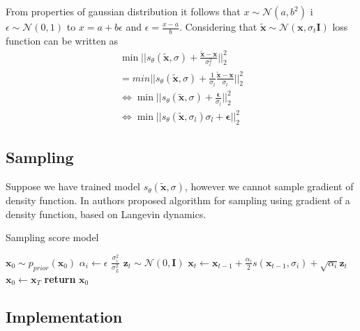\documentclass[10pt]{article}
\begin{document}
From properties of gaussian distribution it follows that $x \sim \mathcal{N}(a, b^2)$ i  $\epsilon \sim \mathcal{N}(0, 1)$ to $x = a + b\epsilon$ and $ \epsilon = \frac{x- a}{b}$. Considering that $\tilde{\textbf{x}} \sim \mathcal{N}(\textbf{x}, \sigma_t \mathbf{I})$ loss function can be written as
\begin{gather}
    \min ||  s_{\theta}(\tilde{\textbf{x}}, \sigma)  + \frac{\tilde{\textbf{x}} - \textbf{x}}{ \sigma_l^2} ||_2^2 \\
    = min ||  s_{\theta}(\tilde{\textbf{x}}, \sigma)  + \frac{1}{\sigma_l} \frac{\tilde{\textbf{x}} - \textbf{x}}{ \sigma_l} ||_2^2 \\
    \iff \min \Big|\Big|  s_{\theta}(\tilde{\textbf{x}}, \sigma)  + \frac{ \bm{\epsilon} }{ \sigma_l} \Big|\Big|_2^2 \\
    \iff \min ||  s_{\theta}(\tilde{\textbf{x}}, \sigma_l) \sigma_l + \bm{\epsilon} ||_2^2
\end{gather}

\subsection{Sampling}
Suppose we have trained model  $ s_{\theta}(\tilde{\textbf{x}}, \sigma)$, however we cannot sample gradient of density function. In \cite{score_model} authors proposed algorithm for sampling using gradient of a density function, based on Langevin dynamics. 

\begin{algorithm} [H]
\caption{Sampling score model}\label{alg:cap}
\begin{algorithmic}

\State $\textbf{x}_0 \sim p_{prior}(\textbf{x}_0)$
    \State $\alpha_i \gets  \epsilon$ $\frac{ \sigma_i^2 }{\sigma_L^2 }$
        \State $\textbf{z}_t \sim \mathcal{N}(0, \mathbf{I})$
       \State $\textbf{x}_t \gets \textbf{x}_{t -1} + \frac{\alpha_i}{2} s(\textbf{x}_{t -1}, \sigma_i ) + \sqrt{\alpha_i}\textbf{z}_t$
    \EndFor
    \State $\textbf{x}_0 \gets \textbf{x}_T$
\EndFor
\State \textbf{return} $\textbf{x}_0$
\end{algorithmic}
\end{algorithm}

\subsection{Implementation}
\end{document}
